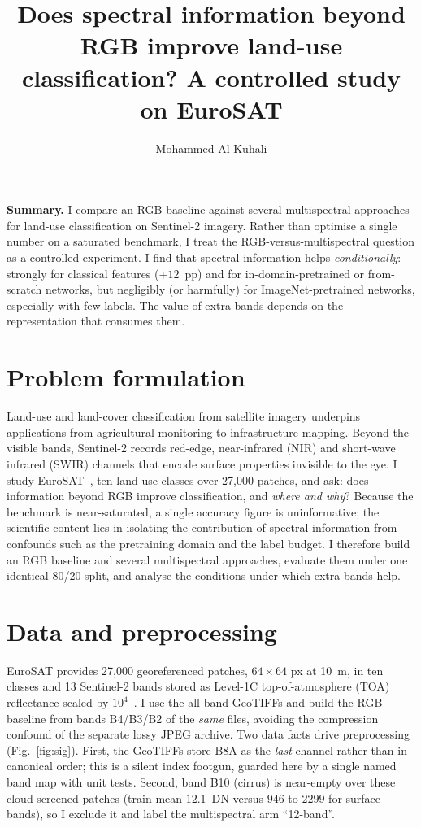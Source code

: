 \documentclass[11pt,a4paper]{article}
\title{\vspace{-1.2cm}Does spectral information beyond RGB improve land-use
classification? A controlled study on EuroSAT}
\author{Mohammed Al-Kuhali}
\date{\vspace{-0.3cm}}
\begin{document}
\maketitle
\vspace{-0.8cm}

\noindent\textbf{Summary.} I compare an RGB baseline against several
multispectral approaches for land-use classification on Sentinel-2 imagery.
Rather than optimise a single number on a saturated benchmark, I treat the
RGB-versus-multispectral question as a controlled experiment. I find that
spectral information helps \emph{conditionally}: strongly for classical features
($+12$~pp) and for in-domain-pretrained or from-scratch networks, but negligibly
(or harmfully) for ImageNet-pretrained networks, especially with few labels. The
value of extra bands depends on the representation that consumes them.

\section{Problem formulation}
Land-use and land-cover classification from satellite imagery underpins
applications from agricultural monitoring to infrastructure mapping. Beyond the
visible bands, Sentinel-2 records red-edge, near-infrared (NIR) and short-wave
infrared (SWIR) channels that encode surface properties invisible to the eye. I
study EuroSAT~\cite{helber2019}, ten land-use classes over 27{,}000 patches, and
ask: does information beyond RGB improve classification, and \emph{where and
why}? Because the benchmark is near-saturated, a single accuracy figure is
uninformative; the scientific content lies in isolating the contribution of
spectral information from confounds such as the pretraining domain and the label
budget. I therefore build an RGB baseline and several multispectral approaches,
evaluate them under one identical 80/20 split, and analyse the conditions under
which extra bands help.

\section{Data and preprocessing}
EuroSAT provides 27{,}000 georeferenced patches, $64\times64$ px at 10~m, in ten
classes and 13 Sentinel-2 bands stored as Level-1C top-of-atmosphere (TOA)
reflectance scaled by $10^4$~\cite{helber2019,helber2018}. I use the all-band
GeoTIFFs and build the RGB baseline from bands B4/B3/B2 of the \emph{same} files,
avoiding the compression confound of the separate lossy JPEG archive. Two data
facts drive preprocessing (Fig.~\ref{fig:sig}). First, the GeoTIFFs store B8A as
the \emph{last} channel rather than in canonical order; this is a silent index
footgun, guarded here by a single named band map with unit tests. Second, band
B10 (cirrus) is near-empty over these cloud-screened patches (train mean
$12.1$~DN versus $946$ to $2299$ for surface bands), so I exclude it and label
the multispectral arm ``12-band''.
\end{document}
